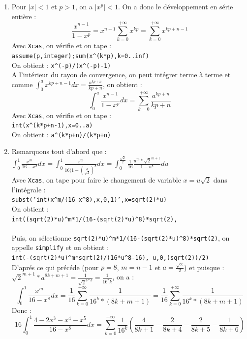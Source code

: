 \documentclass[a4paper,11pt]{book}
\begin{document}
\begin{enumerate}
\item Pour $|x| < 1$ et $p>1$, on a  $|x^p | < 1$. On a donc le d\'eveloppement
 en s\'erie enti\`ere :
$$\frac{x^{n-1}}{1-x^p}=x^{n-1}\sum_{k=0}^{+\infty}x^{kp}=\sum_{k=0}^{+\infty}x^{kp+n-1}$$
Avec {\tt Xcas}, on v\'erifie et on tape :\\
{\tt assume(p,integer);sum(x\verb|^|(k*p),k=0..inf)}\\
On obtient : {\tt x\verb|^|(-p)/(x\verb|^|(-p)-1)}\\
A l’int\'erieur du rayon de convergence, on peut int\'egrer terme \`a terme et
comme $\int_0^ax^{kp+n-1}dx=\frac{a^{kp+n}}{kp+n}$, on obtient :
$$\int_0^a\frac{x^{n-1}}{1-x^p}dx=\sum_{k=0}^{+\infty}\frac{a^{kp+n}}{kp+n}$$
Avec {\tt Xcas}, on v\'erifie et on tape :\\
{\tt int(x\verb|^|(k*p+n-1),x=0..a)}\\
On obtient : {\tt a\verb|^|(k*p+n)/(k*p+n)}

\item Remarquons tout d'abord que :\\
$\displaystyle\int_0^1\frac{x^m}{16-x^8}dx=\int_0^1\frac{x^m}{16(1-{(\frac{x}{\sqrt 2})}^8}dx=
\int_0^{\frac{\sqrt 2}{2}}\frac{1}{16}\frac{u^m*{\sqrt 2}^{m+1}}{1-u^8}du$\\
Avec {\tt Xcas}, on tape pour faire  le changement de variable $x=u\sqrt 2$
dans l'int\'egrale :\\
{\tt subst('int(x\verb|^|m/(16-x\verb|^|8),x,0,1)',x=sqrt(2)*u)}\\
On obtient :\\
{\tt int((sqrt(2)*u)\verb|^|m*1/(16-(sqrt(2)*u)\verb|^|8)*sqrt(2),}\\
\hspace*{3cm}{\tt u,0,(sqrt(2))/2)}\\
Puis, on s\'electionne {
\tt sqrt(2)*u)\verb|^|m*1/(16-(sqrt(2)*u)\verb|^|8)*sqrt(2)}, on
appelle {\tt simplify} et on obtient :\\
{\tt int(-(sqrt(2)*u)\verb|^|m*sqrt(2)/(16*u\verb|^|8-16), u,0,(sqrt(2))/2)}\\
D'apr\'es ce qui pr\'ec\'ede (pour $p=8$, $m=n-1$ et $a=\frac{\sqrt 2}{2}$)
et puisque :\\
$\displaystyle{\sqrt 2}^{m+1}*a^{8k+m+1}=\frac{1}{{\sqrt 2}^{8*k}}=\frac{1}{16^*k}$, on a :\\
$$\int_0^1\frac{x^m}{16-x^8}dx=\frac{1}{16}\sum_{k=0}^{+\infty}\frac{1}{16^k*(8k+m+1)}=\frac{1}{16}\sum_{k=0}^{+\infty}\frac{1}{16^k*(8k+m+1)}$$
Donc :\\
$$16\int_0^1\frac{4-2x^3-x^4-x^5}{16-x^8}dx=
\sum_{k=0}^{+\infty}\frac{1}{16^k}(\frac{4}{8k+1}-\frac{2}{8k+4}-\frac{2}{8k+5}- \frac{1}{8k+6})$$


\end{enumerate}
\end{document}
